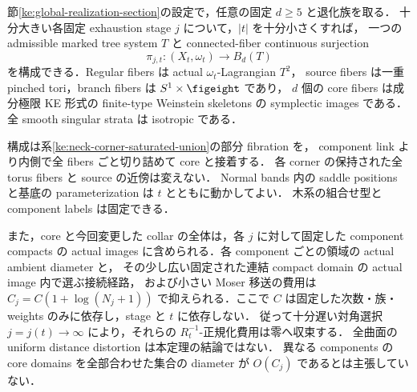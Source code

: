 \begin{theorem}
\label{ke:actual-global-fibration}
節\ref{ke:global-realization-section}の設定で，任意の固定 $d\ge5$ と退化族を取る．
十分大きい各固定 exhaustion stage $j$ について，$|t|$ を十分小さくすれば，
一つの admissible marked tree system $T$ と connected-fiber continuous surjection
\[
 \pi_{j,t}:(X_t,\omega_t)\longrightarrow B_d(T)
\]
を構成できる．Regular fibers は actual $\omega_t$-Lagrangian $T^2$，
source fibers は一重 pinched tori，branch fibers は $S^1\times\figeight$ であり，
$d$ 個の core fibers は成分極限 KE 形式の finite-type Weinstein skeletons の
symplectic images である．全 smooth singular strata は isotropic である．

構成は系\ref{ke:neck-corner-saturated-union}の部分 fibration を，
component link より内側で全 fibers ごと切り詰めて core と接着する．
各 corner の保持された全 torus fibers と source の近傍は変えない．
Normal bands 内の saddle positions と基底の parameterization は $t$ とともに動かしてよい．
木系の組合せ型と component labels は固定できる．

また，core と今回変更した collar の全体は，各 $j$ に対して固定した component compacts の
actual images に含められる．各 component ごとの領域の actual ambient diameter と，
その少し広い固定された連結 compact domain の actual image 内で選ぶ接続経路，
および小さい Moser 移送の費用は
$C_j=C(1+\log(N_j+1))$ で抑えられる．ここで $C$ は固定した次数・族・weights
のみに依存し，stage と $t$ に依存しない．
従って十分遅い対角選択 $j=j(t)\to\infty$ により，それらの
$R_t^{-1}$-正規化費用は零へ収束する．
全曲面の uniform distance distortion は本定理の結論ではない．
異なる components の core domains を全部合わせた集合の diameter が
$O(C_j)$ であるとは主張していない．
\end{theorem}

